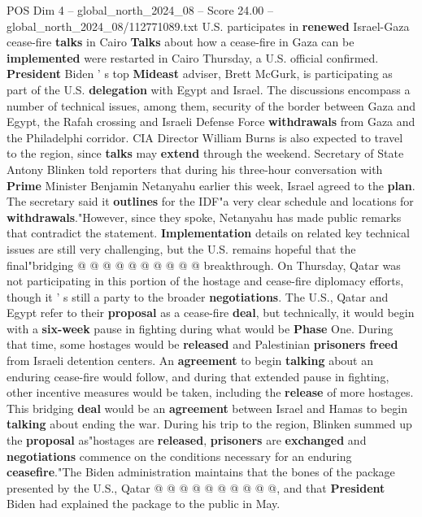 \begin{textsample}{POS Dim 4 – global\_north\_2024\_08 – Score 24.00 – global\_north\_2024\_08/112771089.txt}  \label{ex:f4_pos_155}
U.S. participates in \textbf{renewed} Israel-Gaza cease-fire \textbf{talks} in Cairo \textbf{Talks} about how a cease-fire in Gaza can be \textbf{implemented} were restarted in Cairo Thursday, a U.S. official confirmed. \textbf{President} Biden ' s top \textbf{Mideast} adviser, Brett McGurk, is participating as part of the U.S. \textbf{delegation} with Egypt and Israel.
The discussions encompass a number of technical issues, among them, security of the border between Gaza and Egypt, the Rafah crossing and Israeli Defense Force \textbf{withdrawals} from Gaza and the Philadelphi corridor.
CIA Director William Burns is also expected to travel to the region, since \textbf{talks} may \textbf{extend} through the weekend.
Secretary of State Antony Blinken told reporters that during his three-hour conversation with \textbf{Prime} Minister Benjamin Netanyahu earlier this week, Israel agreed to the \textbf{plan}.
The secretary said it \textbf{outlines} for the IDF"a very clear schedule and locations for \textbf{withdrawals}."However, since they spoke, Netanyahu has made public remarks that contradict the statement. \textbf{Implementation} details on related key technical issues are still very challenging, but the U.S. remains hopeful that the final"bridging @ @ @ @ @ @ @ @ @ @ breakthrough.
On Thursday, Qatar was not participating in this portion of the hostage and cease-fire diplomacy efforts, though it ' s still a party to the broader \textbf{negotiations}.
The U.S., Qatar and Egypt refer to their \textbf{proposal} as a cease-fire \textbf{deal}, but technically, it would begin with a \textbf{six-week} pause in fighting during what would be \textbf{Phase} One.
During that time, some hostages would be \textbf{released} and Palestinian \textbf{prisoners} \textbf{freed} from Israeli detention centers.
An \textbf{agreement} to begin \textbf{talking} about an enduring cease-fire would follow, and during that extended pause in fighting, other incentive measures would be taken, including the \textbf{release} of more hostages.
This bridging \textbf{deal} would be an \textbf{agreement} between Israel and Hamas to begin \textbf{talking} about ending the war.
During his trip to the region, Blinken summed up the \textbf{proposal} as"hostages are \textbf{released}, \textbf{prisoners} are \textbf{exchanged} and \textbf{negotiations} commence on the conditions necessary for an enduring \textbf{ceasefire}."The Biden administration maintains that the bones of the package presented by the U.S., Qatar @ @ @ @ @ @ @ @ @ @, and that \textbf{President} Biden had explained the package to the public in May.

\end{textsample}
